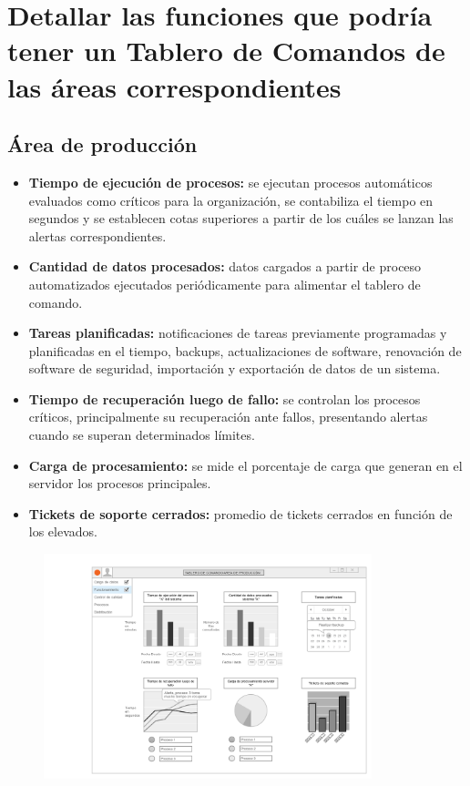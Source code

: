 \begin{itemize}
\begin{itemize}
                \end{itemize}
            \end{itemize}   

            
            
            
\newpage
    \section{Detallar las funciones que podría tener un Tablero de Comandos de las áreas correspondientes} %
    
    \subsection{Área de producción}
    	\begin{itemize}
			\item\textbf{Tiempo de ejecución de procesos:} se ejecutan procesos automáticos evaluados como críticos para la organización, se contabiliza el tiempo en segundos y se establecen cotas superiores a partir de los cuáles se lanzan las alertas correspondientes.
            \item\textbf{Cantidad de datos procesados:} datos cargados a partir de proceso automatizados ejecutados periódicamente para alimentar el tablero de comando.
            \item\textbf{Tareas planificadas:} notificaciones de tareas previamente programadas y planificadas en el tiempo, backups, actualizaciones de software, renovación de software de seguridad, importación y exportación de datos de un sistema.
            \item\textbf{Tiempo de recuperación luego de fallo:} se controlan los procesos críticos, principalmente su recuperación ante fallos, presentando alertas cuando se superan determinados límites.
            \item \textbf{Carga de procesamiento: }se mide el porcentaje de carga que generan en el servidor los procesos principales.
            \item \textbf{Tickets de soporte cerrados: }promedio de tickets cerrados en función de los elevados.
		\end{itemize}
        
	\begin{figure}[h]
	  \centering
  	  \includegraphics[width=0.85\textwidth]{img/tp2_integrador/area_produccion}
      \label{Área de producción}
	\end{figure}
    
